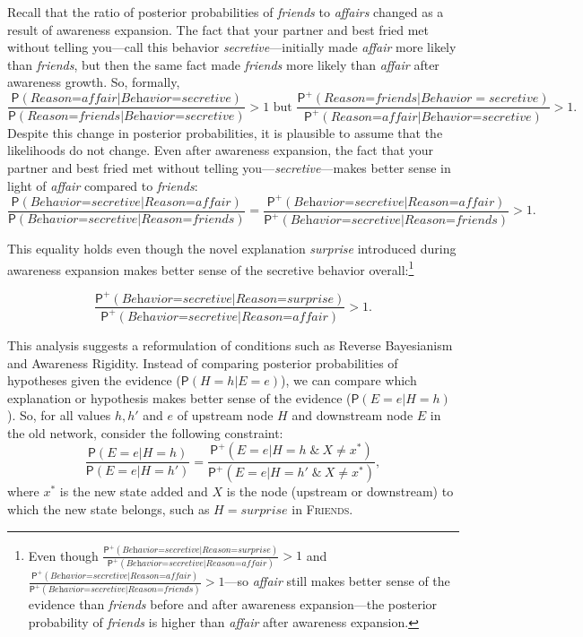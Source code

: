 \documentclass[
  11pt,
  dvipsnames,enabledeprecatedfontcommands, todos]{scrartcl}
\newcommand{\pr}[1]{\ensuremath{\mathsf{P}(#1)}}
\newcommand{\ppr}[2]{\ensuremath{\mathsf{P}^{#1}(#2)}}
\begin{document}
Recall that the ratio of posterior probabilities of \textit{friends} to
\textit{affairs} changed as a result of awareness expansion. The fact
that your partner and best fried met without telling you---call this
behavior \textit{secretive}---initially made \textit{affair} more likely
than \textit{friends}, but then the same fact made \textit{friends} more
likely than \textit{affair} after awareness growth. So, formally,
\[\frac{\pr{\textit{Reason=affair} \vert \textit{Behavior=secretive}}}{\pr{\textit{Reason=friends} \vert \textit{Behavior=secretive}}} > 1 \text{ but } \frac{\ppr{+}{\textit{Reason=friends} \vert Behavior=secretive}}{\ppr{+}{\textit{Reason=affair} \vert \textit{Behavior=secretive}}}>1.\]
Despite this change in posterior probabilities, it is plausible to
assume that the likelihoods do not change. Even after awareness
expansion, the fact that your partner and best fried met without telling
you---\textit{secretive}---makes better sense in light of
\textit{affair} compared to \textit{friends}:
\[\frac{\pr{\textit{Behavior=secretive} \vert \textit{Reason=affair}}}{\pr{\textit{Behavior=secretive} \vert  \textit{Reason=friends}}} = \frac{\ppr{+}{\textit{Behavior=secretive} \vert \textit{Reason=affair}}}{\ppr{+}{\textit{Behavior=secretive} \vert \textit{Reason=friends}}}>1.\]

\noindent This equality holds even though the novel explanation
\textit{surprise} introduced during awareness expansion makes better
sense of the secretive behavior overall:\footnote{Even though
  \(\frac{\ppr{+}{\textit{Behavior=secretive} \vert \textit{Reason=surprise}}}{\ppr{+}{\textit{Behavior=secretive} \vert \textit{Reason=affair}}}>1\)
  and
  \(\frac{\ppr{+}{\textit{Behavior=secretive} \vert \textit{Reason=affair}}}{\ppr{+}{\textit{Behavior=secretive} \vert \textit{Reason=friends}}}>1\)---so
  \textit{affair} still makes better sense of the evidence than
  \textit{friends} before and after awareness expansion---the posterior
  probability of \textit{friends} is higher than \textit{affair} after
  awareness expansion.}

\[\frac{\ppr{+}{\textit{Behavior=secretive} \vert \textit{Reason=surprise}}}{\ppr{+}{\textit{Behavior=secretive} \vert \textit{Reason=affair}}}>1. \]

This analysis suggests a reformulation of conditions such as Reverse
Bayesianism and Awareness Rigidity. Instead of comparing posterior
probabilities of hypotheses given the evidence (\(\pr{H=h \vert E=e}\)),
we can compare which explanation or hypothesis makes better sense of the
evidence (\(\pr{E=e \vert H=h}\)). So, for all values \(h, h'\) and
\(e\) of upstream node \(H\) and downstream node \(E\) in the old
network, consider the following constraint:
\[\frac{\pr{E=e \vert H=h}}{\pr{E=e \vert H=h'}} = \frac{\ppr{+}{E=e \vert H=h  \; \& \: X\neq x^*}}{\ppr{+}{E=e \vert H=h'  \; \& \: X\neq x^*}}, \tag{C}\]
where \(x^*\) is the new state added and \(X\) is the node (upstream or
downstream) to which the new state belongs, such as
\(H=\textit{surprise}\) in \textsc{Friends}.
\end{document}
